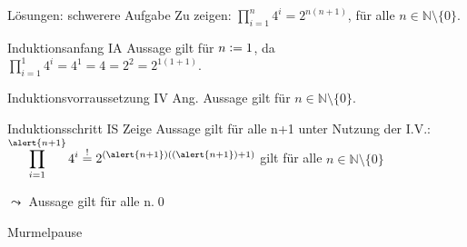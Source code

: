 {\begin{frame}[fragile]{Lösungen: schwerere Aufgabe}
     Zu zeigen: $\displaystyle\prod_{i=1}^{n} 4^i = 2^{n(n+1)}$, für alle $n \in \mathbb{N}\setminus \{0\}$.
    \begin{alertblock}{Induktionsanfang IA}
        Aussage gilt für $n\vcentcolon= 1$, da $\displaystyle\prod_{i=1}^{1} 4^i = 4^1 = 4 = 2^2 = 2^{1(1+1)}$.
    \end{alertblock}
    \begin{alertblock}{Induktionsvorraussetzung IV}
        Ang. Aussage gilt für $n \in\mathbb{N}\setminus \{0\}$.
    \end{alertblock}
    \begin{alertblock}{Induktionsschritt IS}
        Zeige Aussage gilt für alle n+1 unter Nutzung der I.V.:\\
        $\displaystyle\prod_{i=1}^{\alert{n+1}} 4^i \overset{!}{=} 2^{(\alert{n+1})((\alert{n+1})+1)}$ gilt für alle $n \in \mathbb{N}\setminus \{0\}$
    \end{alertblock}
    \alert{$\leadsto$ Aussage gilt für alle n.}\qed
\end{frame}
}


\begin{frame}[standout]
  Murmelpause
\end{frame}




